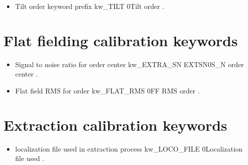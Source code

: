 \begin{itemize}

% 
\item {}
{Tilt order keyword prefix}
{kw\_TILT}
{}{0}{Tilt order}
{\calSLIT}{\spirouKeywords}{\calSLIT.\progMAIN}

\end{itemize}

\section{Flat fielding calibration keywords}
\label{ch:output_keywords:flatfielding}

\begin{itemize}

% 
\item {}
{Signal to noise ratio for order center}
{kw\_EXTRA\_SN}
{EXTSN}{0}{S\_N order center}
{\calFFraw}{\spirouKeywords}{\calFFraw.\progMAIN}


% 
\item {}
{Flat field RMS for order}
{kw\_FLAT\_RMS}
{}{0}{FF RMS order}
{\calFFraw}{\spirouKeywords}{\calFFraw.\progMAIN}

\end{itemize}

\section{Extraction calibration keywords}
\label{ch:output_keywords:extraction}

\begin{itemize}

% 
\item {}
{localization file used in extraction process}
{kw\_LOCO\_FILE}
{}{0}{Localization file used}
{\calextractRAW}{\spirouKeywords}{\calextractRAW.\progMAIN}

\end{itemize}